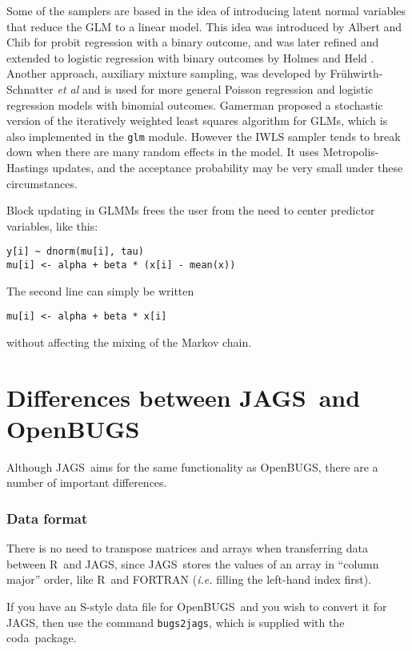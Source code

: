 \documentclass[11pt, a4paper, titlepage]{report}
\newcommand{\JAGS}{\textsf{JAGS}}
\newcommand{\OpenBUGS}{\textsf{OpenBUGS}}
\newcommand{\R}{\textsf{R}}
\newcommand{\CODA}{\textsf{coda}}
\begin{document}
Some of the samplers are based in the idea of introducing latent
normal variables that reduce the GLM to a linear model. This idea was
introduced by Albert and Chib \cite{AlbertChib93} for probit
regression with a binary outcome, and was later refined and extended
to logistic regression with binary outcomes by Holmes and Held
\cite{HolmesHeld06}. Another approach, auxiliary mixture sampling,
was developed by Fr{\"u}hwirth-Schnatter {\em et al}
\cite{Fruhwirth-Schnatter09} and is used for more general Poisson
regression and logistic regression models with binomial outcomes.
Gamerman \cite{Gamerman97} proposed a stochastic version of the iteratively
weighted least squares algorithm for GLMs, which is also implemented
in the \verb+glm+ module. However the IWLS sampler tends to break down
when there are many random effects in the model. It uses
Metropolis-Hastings updates, and the acceptance probability may be
very small under these circumstances.

Block updating in GLMMs frees the user from the need to center
predictor variables, like this:
\begin{verbatim}
y[i] ~ dnorm(mu[i], tau)
mu[i] <- alpha + beta * (x[i] - mean(x))
\end{verbatim}
The second line can simply be written
\begin{verbatim}
mu[i] <- alpha + beta * x[i]
\end{verbatim}
without affecting the mixing of the Markov chain.  

\chapter{Differences between \JAGS\ and \OpenBUGS}

Although \JAGS\ aims for the same functionality as \OpenBUGS, there are
a number of important differences.

\subsection{Data format}

There is no need to transpose matrices and arrays when transferring
data between \R\ and \JAGS, since \JAGS\ stores the values of an array
in ``column major'' order, like \R\ and FORTRAN ({\em i.e.} filling
the left-hand index first).

If you have an \textsf{S}-style data file for \OpenBUGS\ and you wish
to convert it for \JAGS, then use the command \texttt{bugs2jags},
which is supplied with the \CODA\ package.
\end{document}
